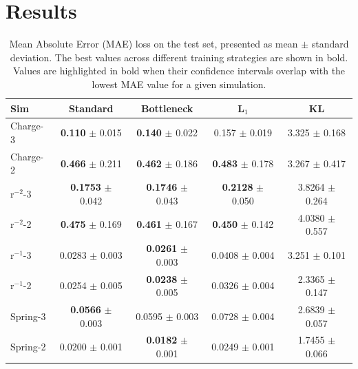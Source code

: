 \documentclass[11pt]{article}
\begin{document}
\section{Results}
\begin{table}[H]
    \centering
    \begin{tabular}{lcccc}
    \hline
    Sim & Standard & Bottleneck & L$_1$ & KL \\
    \hline
    Charge-3 & \textbf{0.110} $\pm$ 0.015 & \textbf{0.140} $\pm$ 0.022 & 0.157 $\pm$ 0.019 & 3.325 $\pm$ 0.168 \\
    Charge-2 & \textbf{0.466} $\pm$ 0.211 & \textbf{0.462} $\pm$ 0.186 & \textbf{0.483} $\pm$ 0.178 & 3.267 $\pm$ 0.417 \\
    r$^{-2}$-3 & \textbf{0.1753} $\pm$ 0.042 & \textbf{0.1746} $\pm$ 0.043 & \textbf{0.2128} $\pm$ 0.050 & 3.8264 $\pm$ 0.264 \\
    r$^{-2}$-2 & \textbf{0.475} $\pm$ 0.169 & \textbf{0.461} $\pm$ 0.167 & \textbf{0.450} $\pm$ 0.142 & 4.0380 $\pm$ 0.557 \\
    r$^{-1}$-3 & 0.0283 $\pm$ 0.003 & \textbf{0.0261} $\pm$ 0.003 & 0.0408 $\pm$ 0.004 & 3.251 $\pm$ 0.101 \\
    r$^{-1}$-2 & 0.0254 $\pm$ 0.005 & \textbf{0.0238} $\pm$ 0.005 & 0.0326 $\pm$ 0.004 & 2.3365 $\pm$ 0.147 \\
    Spring-3 & \textbf{0.0566} $\pm$ 0.003 & 0.0595 $\pm$ 0.003 & 0.0728 $\pm$ 0.004 & 2.6839 $\pm$ 0.057 \\
    Spring-2 & 0.0200 $\pm$ 0.001 & \textbf{0.0182} $\pm$ 0.001 & 0.0249 $\pm$ 0.001 & 1.7455 $\pm$ 0.066 \\
    \hline
    \end{tabular}
    \caption{Mean Absolute Error (MAE) loss on the test set, presented as mean $\pm$ standard deviation. The best values across different training strategies are shown in bold. Values are highlighted in bold when their confidence intervals overlap with the lowest MAE value for a given simulation.}
    \label{tab:mae_table_with_std}
    \end{table}
\end{document}
